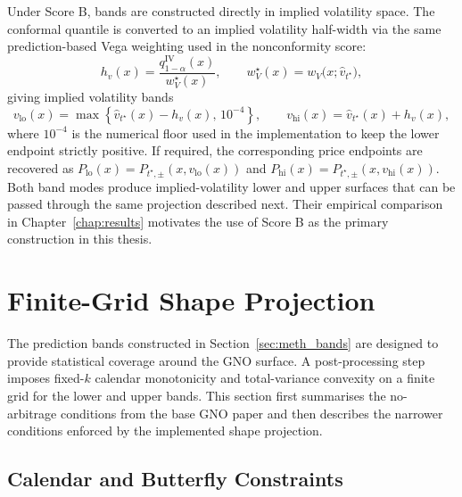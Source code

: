 Under Score B, bands are constructed directly in implied volatility space. The conformal quantile is converted to an implied volatility half-width via the same prediction-based Vega weighting used in the nonconformity score:
\begin{equation}
    h_v(x) = \frac{q^{\text{IV}}_{1-\alpha}(x)}{w_V^\star(x)}, \qquad
    w_V^\star(x) = w_V\big(x;\hat{v}_{t^\star}\big),
    \label{eq:iv_band_halfwidth}
\end{equation}
giving implied volatility bands
\begin{equation}
    v_{\text{lo}}(x) = \max\!\left\{\hat{v}_{t^\star}(x)-h_v(x),\,10^{-4}\right\}, \qquad
    v_{\text{hi}}(x) = \hat{v}_{t^\star}(x)+h_v(x),
    \label{eq:iv_bands}
\end{equation}
where $10^{-4}$ is the numerical floor used in the implementation to keep the lower endpoint strictly positive. If required, the corresponding price endpoints are recovered as $P_{\text{lo}}(x)=P_{t^\star,\pm}(x,v_{\text{lo}}(x))$ and $P_{\text{hi}}(x)=P_{t^\star,\pm}(x,v_{\text{hi}}(x))$. Both band modes produce implied-volatility lower and upper surfaces that can be passed through the same projection described next. Their empirical comparison in Chapter~\ref{chap:results} motivates the use of Score B as the primary construction in this thesis.

\section{Finite-Grid Shape Projection}
\label{sec:meth_arbitrage}

The prediction bands constructed in Section~\ref{sec:meth_bands} are designed to provide statistical coverage around the GNO surface. A post-processing step imposes fixed-$k$ calendar monotonicity and total-variance convexity on a finite grid for the lower and upper bands. This section first summarises the no-arbitrage conditions from the base GNO paper \cite{gonon2024operator} and then describes the narrower conditions enforced by the implemented shape projection.

\subsection{Calendar and Butterfly Constraints}
\label{subsec:meth_calendar_butterfly}

